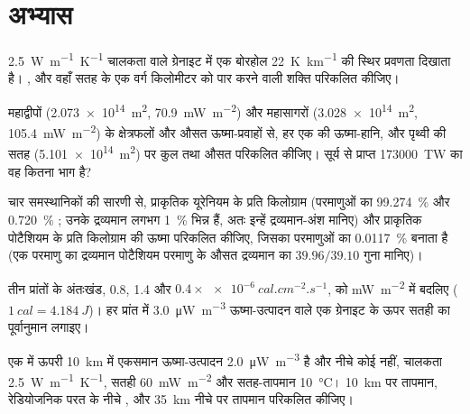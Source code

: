 \section{अभ्यास}

\begin{exercise}[$\star$]\label{exo:b1:heat-budget:1}
\qty{2.5}{W.m^{-1}.K^{-1}} चालकता वाले ग्रेनाइट में एक बोरहोल \qty{22}{K.km^{-1}} की स्थिर प्रवणता दिखाता है। , और वहाँ सतह के एक वर्ग किलोमीटर को पार करने वाली शक्ति परिकलित कीजिए।
\end{exercise}

\begin{exercise}[$\star$]\label{exo:b1:heat-budget:2}
महाद्वीपों (\qty{2.073e14}{m^2}, \qty{70.9}{mW.m^{-2}}) और महासागरों (\qty{3.028e14}{m^2}, \qty{105.4}{mW.m^{-2}}) के क्षेत्रफलों और औसत ऊष्मा-प्रवाहों से, हर एक की ऊष्मा-हानि, और पृथ्वी की सतह (\qty{5.101e14}{m^2}) पर कुल तथा औसत  परिकलित कीजिए। सूर्य से प्राप्त \qty{173000}{TW} का वह कितना भाग है?
\end{exercise}

\begin{exercise}[$\star$]\label{exo:b1:heat-budget:3}
चार समस्थानिकों की सारणी से, प्राकृतिक यूरेनियम के प्रति किलोग्राम (परमाणुओं का \qty{99.274}{\percent}  और \qty{0.720}{\percent} ; उनके द्रव्यमान लगभग \qty{1}{\percent} भिन्न हैं, अतः इन्हें द्रव्यमान-अंश मानिए) और प्राकृतिक पोटैशियम के प्रति किलोग्राम की ऊष्मा परिकलित कीजिए, जिसका  परमाणुओं का \qty{0.0117}{\percent} बनाता है (एक  परमाणु का द्रव्यमान पोटैशियम परमाणु के औसत द्रव्यमान का $39.96/39.10$ गुना मानिए)।
\end{exercise}

\begin{exercise}[$\star$]\label{exo:b1:heat-budget:4}
तीन प्रांतों के अंतःखंड, 0.8, 1.4 और $0.4\times\qty{e-6}{cal.cm^{-2}.s^{-1}}$, को \unit{mW.m^{-2}} में बदलिए ($\qty{1}{cal} = \qty{4.184}{J}$)। हर प्रांत में \qty{3.0}{\micro W.m^{-3}} ऊष्मा-उत्पादन वाले एक ग्रेनाइट के ऊपर सतही  का पूर्वानुमान लगाइए।
\end{exercise}

\begin{exercise}[$\star\star$]\label{exo:b1:heat-budget:5}
एक  में ऊपरी \qty{10}{km} में एकसमान ऊष्मा-उत्पादन \qty{2.0}{\micro W.m^{-3}} है और नीचे कोई नहीं, चालकता \qty{2.5}{W.m^{-1}.K^{-1}}, सतही  \qty{60}{mW.m^{-2}} और सतह-तापमान \qty{10}{\degreeCelsius}। \qty{10}{km} पर तापमान, रेडियोजनिक परत के नीचे , और \qty{35}{km} नीचे  पर तापमान परिकलित कीजिए।
\end{exercise}

